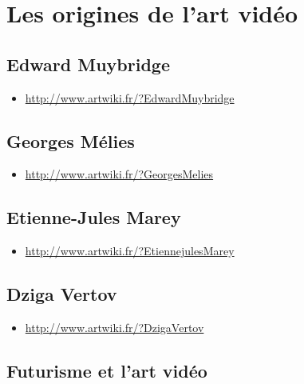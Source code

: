\documentclass[
]{book}
\providecommand{\tightlist}{%
  \setlength{\itemsep}{0pt}\setlength{\parskip}{0pt}}
\begin{document}
\hypertarget{les-origines-de-lart-viduxe9o}{%
\section{Les origines de l'art vidéo}\label{les-origines-de-lart-viduxe9o}}

\hypertarget{edward-muybridge}{%
\subsection{Edward Muybridge}\label{edward-muybridge}}

\begin{itemize}
\tightlist
\item
  \url{http://www.artwiki.fr/?EdwardMuybridge}
\end{itemize}

\hypertarget{georges-muxe9lies}{%
\subsection{Georges Mélies}\label{georges-muxe9lies}}

\begin{itemize}
\tightlist
\item
  \url{http://www.artwiki.fr/?GeorgesMelies}
\end{itemize}

\hypertarget{etienne-jules-marey}{%
\subsection{Etienne-Jules Marey}\label{etienne-jules-marey}}

\begin{itemize}
\tightlist
\item
  \url{http://www.artwiki.fr/?EtiennejulesMarey}
\end{itemize}

\hypertarget{dziga-vertov}{%
\subsection{Dziga Vertov}\label{dziga-vertov}}

\begin{itemize}
\tightlist
\item
  \url{http://www.artwiki.fr/?DzigaVertov}
\end{itemize}

\hypertarget{futurisme-et-lart-viduxe9o}{%
\subsection{Futurisme et l'art vidéo}\label{futurisme-et-lart-viduxe9o}}
\end{document}

